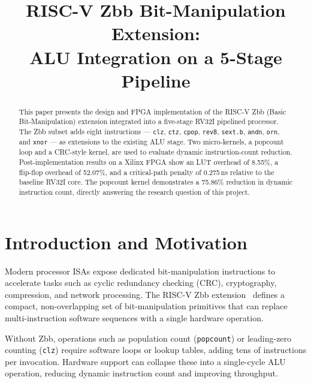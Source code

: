 \documentclass[conference]{IEEEtran}
\begin{document}
	
	\title{RISC-V Zbb Bit-Manipulation Extension:\\
		ALU Integration on a 5-Stage Pipeline}
	
	\author{
	}
	
	\maketitle
	
	\begin{abstract}
		This paper presents the design and FPGA implementation of the RISC-V Zbb
		(Basic Bit-Manipulation) extension integrated into a five-stage RV32I
		pipelined processor.
		The Zbb subset adds eight instructions — \texttt{clz}, \texttt{ctz},
		\texttt{cpop}, \texttt{rev8}, \texttt{sext.b}, \texttt{andn}, \texttt{orn},
		and \texttt{xnor} — as extensions to the existing ALU stage.
		Two micro-kernels, a popcount loop and a CRC-style kernel, are used to
		evaluate dynamic instruction-count reduction.
		Post-implementation results on a Xilinx FPGA show an LUT overhead of 8.55\%,
		a flip-flop overhead of 52.07\%, and a critical-path penalty of 0.275\,ns
		relative to the baseline RV32I core.
		The popcount kernel demonstrates a 75.86\% reduction in dynamic instruction
		count, directly answering the research question of this project.
	\end{abstract}
	
	\section{Introduction and Motivation}
	
	Modern processor ISAs expose dedicated bit-manipulation instructions to
	accelerate tasks such as cyclic redundancy checking (CRC), cryptography,
	compression, and network processing.
	The RISC-V Zbb extension~\cite{riscv-isa} defines a compact, non-overlapping
	set of bit-manipulation primitives that can replace multi-instruction software
	sequences with a single hardware operation.
	
	Without Zbb, operations such as population count (\texttt{popcount}) or
	leading-zero counting (\texttt{clz}) require software loops or lookup tables,
	adding tens of instructions per invocation.
	Hardware support can collapse these into a single-cycle ALU operation,
	reducing dynamic instruction count and improving throughput.
	
\end{document}
